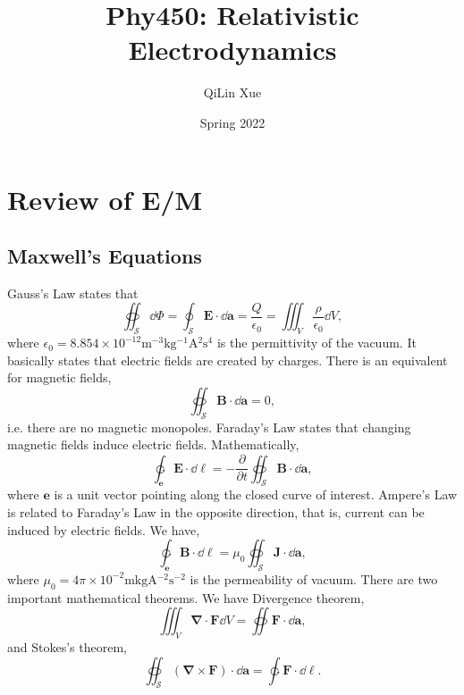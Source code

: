 \documentclass{article}
\title{Phy450: Relativistic Electrodynamics}
\author{QiLin Xue}
\date{Spring 2022}
\numberwithin{equation}{section}
\begin{document}
\maketitle
\tableofcontents

\newpage
\section{Review of E/M}
\subsection{Maxwell's Equations}
Gauss's Law states that 
\begin{equation}
    \oiint_{\mathcal{S}}\dd{\Phi} = \oint_{\mathcal{S}} \bm{E} \cdot \dd{\bm{a}} = \frac{Q}{\epsilon_0} = \iiint_{V} \frac{\rho}{\epsilon_0} \dd{V},
\end{equation}
where $\epsilon_0 = 8.854\times 10^{-12} \si{\meter^{-3}\kilo\gram^{-1}\ampere^{2}\second^{4}}$ is the permittivity of the vacuum. It basically states that electric fields are created by charges. There is an equivalent for magnetic fields,
\begin{equation}
    \oiint_{\mathcal{S}} \bm{B}\cdot \dd{\bm{a}} = 0,
\end{equation}
i.e. there are no magnetic monopoles. Faraday's Law states that changing magnetic fields induce electric fields. Mathematically,
\begin{equation}
    \ointctrclockwise_{\bm{e}} \bm{E} \cdot \dd{\bm{\ell}} = - \frac{\partial}{\partial t}\oiint_{\mathcal{S}} \bm{B}\cdot \dd{\bm{a}},
\end{equation}
where $\bm{e}$ is a unit vector pointing along the closed curve of interest. Ampere's Law is related to Faraday's Law in the opposite direction, that is, current can be induced by electric fields. We have,
\begin{equation}
    \ointctrclockwise_{\bm{e}} \bm{B}\cdot \dd{\bm{\ell}} = \mu_0 \oiint_{\mathcal{S}} \bm{J} \cdot \dd{\bm{a}},
\end{equation}
where $\mu_0 = 4\pi \times 10^{-2} \si{\meter\kilo\gram\ampere^{-2}\second^{-2}}$ is the permeability of vacuum. There are two important mathematical theorems. We have Divergence theorem,
\begin{equation}
    \iiint_{V} \bm{\nabla}\cdot \bm{F} \dd{V} = \oiint \bm{F} \cdot \dd{\bm{a}},
\end{equation} 
and Stokes's theorem,
\begin{equation}
    \oiint_{\mathcal{S}}(\bm{\nabla}\times \bm{F}) \cdot \dd{\bm{a}} = \ointctrclockwise \bm{F} \cdot \dd{\bm{\ell}}. 
\end{equation}
\end{document}
